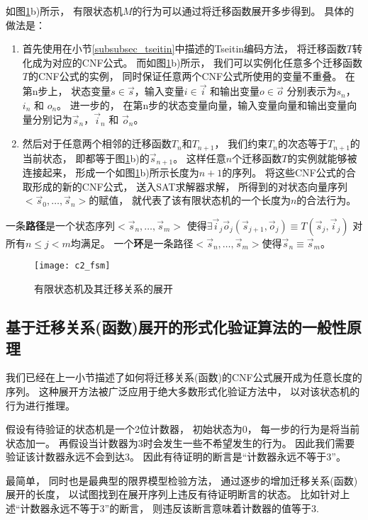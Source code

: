 如图\ref{c2_fsm}b)所示，
有限状态机$M$的行为可以通过将迁移函数展开多步得到。
具体的做法是：
\begin{enumerate}
\item 首先使用在小节\ref{subsubsec_tseitin}中描述的Tseitin编码方法，
将迁移函数$T$转化成为对应的CNF公式。
而如图\ref{c2_fsm}b)所示，
我们可以实例化任意多个迁移函数$T$的CNF公式的实例，
同时保证任意两个CNF公式所使用的变量不重叠。
在第n步上，
状态变量$s\in\vec{s}$，输入变量$i\in\vec{i}$ 和输出变量$o\in\vec{o}$
分别表示为$s_n$，$i_n$ 和 $o_n$。
进一步的，
在第n步的状态变量向量，输入变量向量和输出变量向量分别记为$\vec{s}_n$，$\vec{i}_n$ 和 $\vec{o}_n$。

\item 然后对于任意两个相邻的迁移函数$T_n$和$T_{n+1}$，
我们约束$T_n$的次态等于$T_{n+1}$的当前状态，
即都等于图\ref{c2_fsm}b)的$\vec{s}_{n+1}$。
这样任意$n$个迁移函数$T$的实例就能够被连接起来，
形成一个如图\ref{c2_fsm}b)所示长度为$n+1$的序列。
将这些CNF公式的合取形成的新的CNF公式，
送入SAT求解器求解，
所得到的对状态向量序列$<\vec{s}_0,\dots,\vec{s}_n>$的赋值，
就代表了该有限状态机的一个长度为$n$的合法行为。
\end{enumerate}


一条\textbf{路径}是一个状态序列$<\vec{s}_n,\dots,\vec{s}_m>$ 使得$\exists \vec{i}_j\vec{o}_j (\vec{s}_{j+1},\vec{o}_j)\equiv T(\vec{s}_j,\vec{i}_j)$ 对所有$n\le j< m$均满足。
一个\textbf{环}是一条路径$<\vec{s}_n,\dots,\vec{s}_m>$使得$\vec{s}_n\equiv \vec{s}_m$。


\begin{figure}[t]
  \centering
  \texttt{[image: c2\_fsm]}
  \caption{有限状态机及其迁移关系的展开}
  \label{c2_fsm}
\end{figure}



\subsection{基于迁移关系(函数)展开的形式化验证算法的一般性原理}\label{subsec_trexp_chap1}
我们已经在上一小节描述了如何将迁移关系(函数)的CNF公式展开成为任意长度的序列。
这种展开方法被广泛应用于绝大多数形式化验证方法中，
以对该状态机的行为进行推理。

假设有待验证的状态机是一个2位计数器，
初始状态为0，
每一步的行为是将当前状态加一。
再假设当计数器为3时会发生一些不希望发生的行为。
因此我们需要验证该计数器永远不会到达3。
因此有待证明的断言是“计数器永远不等于3”。

最简单，
同时也是最典型的限界模型检验方法，
通过逐步的增加迁移关系(函数)展开的长度，
以试图找到在展开序列上违反有待证明断言的状态。
比如针对上述“计数器永远不等于3”的断言，
则违反该断言意味着计数器的值等于3.

